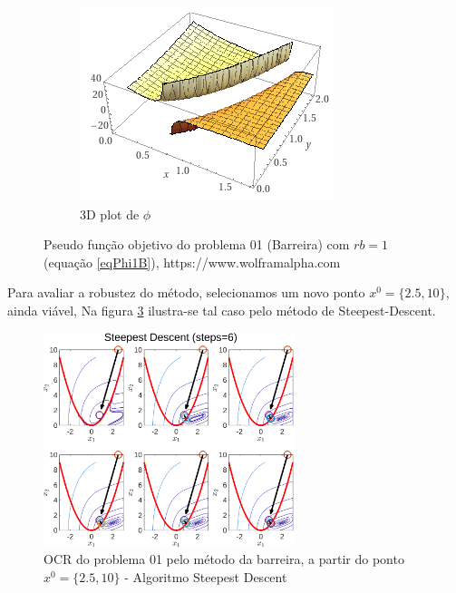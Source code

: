 \documentclass[10pt, a4paper]{article}
\begin{document}
\begin{figure}[H]
\begin{subfigure}{0.45\textwidth}
            \includegraphics[width=\textwidth]{wolf_3d.PNG}
            \caption{3D plot de $\phi$}
            \label{fig:wolf_3d}
      \end{subfigure}
      \caption{Pseudo fun\c c\~ao objetivo do problema 01 (Barreira) com $rb=1$ (equa\c c\~ao \ref{eqPhi1B}), https://www.wolframalpha.com}
      \label{fig:wolf}
\end{figure}

Para avaliar a robustez do m\'etodo, selecionamos um novo ponto $x^0=\{2.5,10\}$, ainda vi\'avel, Na figura \ref{fig:fig04} ilustra-se tal caso pelo m\'etodo de Steepest-Descent.

\begin{figure}[H]
      \centering
      \includegraphics[width=0.65\textwidth]{fig04_P01_BAR_X2_SD.png}
      \caption{OCR do problema 01 pelo m\'etodo da barreira, a partir do ponto $x^0=\{2.5,10\}$ - Algoritmo Steepest Descent}
      \label{fig:fig04}
\end{figure}
\end{document}
